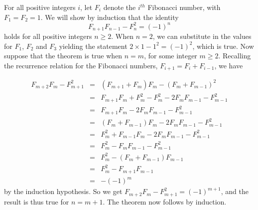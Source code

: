 \documentclass[12pt]{article}
\begin{document}

For all positive integers $i$, let $F_i$ denote the $i^{th}$
Fibonacci number, with $F_1 = F_2 = 1$. We will show by
induction that the identity
$$F_{n+1}F_{n-1} - F_n^2 = (-1)^n$$
holds for all positive integers $n\geq 2$.
When $n = 2$, we can substitute in the values for $F_1$, $F_2$
and $F_{3}$ yielding the statement $2\times 1 - 1^2 = (-1)^2$, which is true.
Now suppose that the theorem is true when $n=m$,
for some integer $m \geq 2$.
Recalling the recurrence relation for the Fibonacci numbers,
$F_{i+1} = F_i + F_{i-1}$, we have

\begin{eqnarray*}
 F_{m+2}F_m - F_{m+1}^2 &=&(F_{m+1}+F_m)F_m -(F_m+F_{m-1})^2\\
 &=& F_{m+1}F_m+F_m^2 - F_m^2 -2F_mF_{m-1}-F_{m-1}^2\\ 
 &=& F_{m+1}F_m -2F_mF_{m-1}-F_{m-1}^2\\ 
 &=& (F_m+F_{m-1})F_m -2F_mF_{m-1}-F_{m-1}^2\\ 
 &=& F_m^2 + F_{m-1}F_m -2F_mF_{m-1} - F_{m-1}^2 \\
 &=& F_m^2 -F_mF_{m-1} - F_{m-1}^2 \\
 &=& F_m^2 - (F_m+F_{m-1})F_{m-1}\\
 &=& F_m^2 - F_{m+1}F_{m-1}\\ 
 &=& -(-1)^m
\end{eqnarray*}
by the induction hypothesis.
So we get $ F_{m+2}F_m - F_{m+1}^2 = (-1)^{m+1} $,
and the result is thus true for $n=m+1$.
The theorem now follows by induction.
\end{document}

